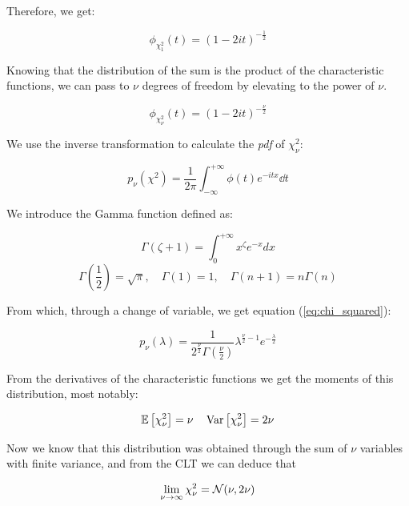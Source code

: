 Therefore, we get:
	
	\[
	\phi_{\chi_1^2}(t) = \left(1-2it\right)^{-\frac{1}{2}}
	\]
	
Knowing that the distribution of the sum  is the product of the characteristic functions, we can pass to $\nu$ degrees of freedom by elevating to the power of $\nu$.
	
	\[
	\phi_{\chi_\nu^2}(t) = \left(1-2it\right)^{-\frac{\nu}{2}}
	\]
	
We use the inverse transformation to calculate the \emph{pdf} of $\chi_\nu^2$:
	
	\[
	p_\nu(\chi^2) = \frac{1}{2\pi}\int_{-\infty}^{+\infty}\phi(t)e^{-itx}\dd t
	\]
	
We introduce the Gamma function defined as:
	
	\[
	\Gamma(\zeta+1) = \int_0^{+\infty}x^\zeta e^{-x} dx
	\]
	\[
	\Gamma\left(\frac{1}{2}\right) = \sqrt{\pi}, \quad \Gamma\left(1\right) = 1, \quad \Gamma\left(n+1\right) = n\Gamma(n)
	\]
	
From which, through a change of variable, we get equation (\ref{eq:chi_squared}):
	
	\[
	p_\nu(\lambda) = \frac{1}{2^{\frac{\nu}{2}} \Gamma(\frac{\nu}{2})}\lambda^{\frac{\nu}{2}-1}e^{-\frac{\lambda}{2}}
	\]
	
From the derivatives of the characteristic functions we get the moments of this distribution, most notably:
	
	\[
	\mathbb{E}\left[\chi_\nu^2\right] =\nu\quad \operatorname{Var}\left[\chi_\nu^2\right] = 2\nu
	\]
	
Now we know that this distribution was obtained through the sum of $\nu$ variables with finite variance, and from the CLT we can deduce that
	
	\[
	\lim_{\nu \to \infty} \chi_\nu^2 = \mathcal{N}(\nu,2\nu)
	\]


